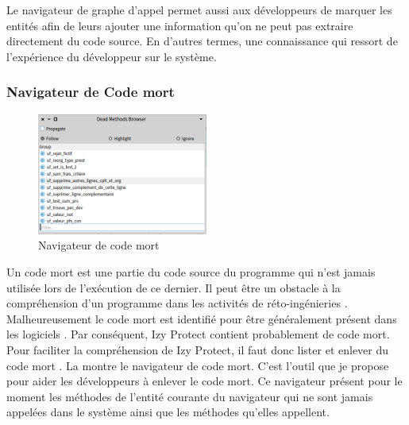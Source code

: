 \documentclass[a4paper]{article}
\begin{document}
Le navigateur de graphe d'appel permet aussi aux développeurs de marquer les entités afin de leurs ajouter une information qu'on ne peut pas extraire directement du code source.
En d'autres termes, une connaissance qui ressort de l'expérience du développeur sur le système.

\subsubsection{Navigateur de Code mort}

\begin{figure}[htbp]
  \begin{center}
  \includegraphics[width=0.5\textwidth]{./figures/deadMethodBrowser.png}
  \caption{Navigateur de code mort}
  \label{fig:deadMethodBrowser}
\end{center}
\vspace{-0.3cm}
\end{figure}
Un code mort est une partie du code source du programme qui n'est jamais utilisée lors de l'exécution de ce dernier.
Il peut être un obstacle à la compréhension d'un programme dans les activités de réto-ingénieries \cite{Wang17a}.
Malheureusement le code mort est identifié pour être généralement présent dans les logiciels \cite{Roma18}. 
Par conséquent, Izy Protect contient probablement de code mort.
Pour faciliter la compréhension de Izy Protect, il faut donc lister et enlever du  code mort .
La  montre le navigateur de code mort.
C'est l'outil que je propose pour aider les développeurs à enlever le code mort.
Ce navigateur présent pour le moment les méthodes de l'entité courante du navigateur qui ne sont jamais appelées dans le système ainsi que les méthodes qu'elles appellent.
\end{document}
